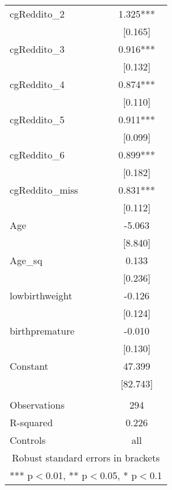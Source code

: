\documentclass[]{article}
\begin{document}
\begin{tabular}{lc}
cgReddito\_2 & 1.325*** \\
 & [0.165] \\
cgReddito\_3 & 0.916*** \\
 & [0.132] \\
cgReddito\_4 & 0.874*** \\
 & [0.110] \\
cgReddito\_5 & 0.911*** \\
 & [0.099] \\
cgReddito\_6 & 0.899*** \\
 & [0.182] \\
cgReddito\_miss & 0.831*** \\
 & [0.112] \\
Age & -5.063 \\
 & [8.840] \\
Age\_sq & 0.133 \\
 & [0.236] \\
lowbirthweight & -0.126 \\
 & [0.124] \\
birthpremature & -0.010 \\
 & [0.130] \\
Constant & 47.399 \\
 & [82.743] \\
 &  \\
Observations & 294 \\
R-squared & 0.226 \\
 Controls & all \\ \hline
\multicolumn{2}{c}{ Robust standard errors in brackets} \\
\multicolumn{2}{c}{ *** p$<$0.01, ** p$<$0.05, * p$<$0.1} \\
\end{tabular}
\end{document}
